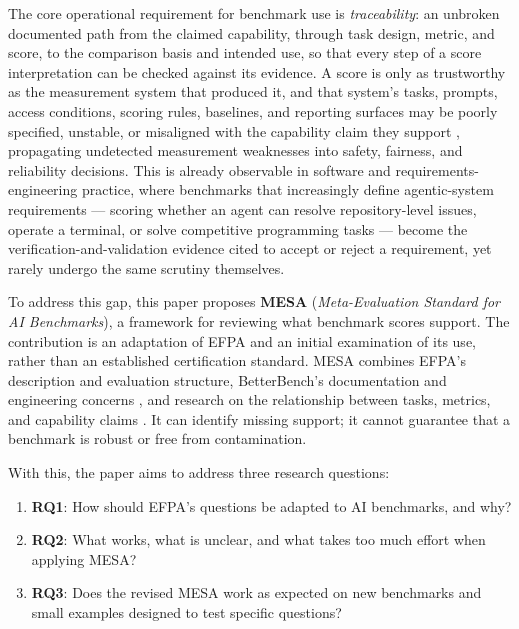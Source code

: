 \documentclass[conference]{IEEEtran}
\begin{document}
    The core operational requirement for benchmark use is \textit{traceability}: an unbroken documented path from the claimed capability, through task design, metric, and score, to the comparison basis and intended use, so that every step of a score interpretation can be checked against its evidence. A score is only as trustworthy as the measurement system that produced it, and that system's tasks, prompts, access conditions, scoring rules, baselines, and reporting surfaces may be poorly specified, unstable, or misaligned with the capability claim they support \cite{singh_leaderboard_illusion,line_goes_up}, propagating undetected measurement weaknesses into safety, fairness, and reliability decisions. This is already observable in software and requirements-engineering practice, where benchmarks that increasingly define agentic-system requirements --- scoring whether an agent can resolve repository-level issues, operate a terminal, or solve competitive programming tasks --- become the verification-and-validation evidence cited to accept or reject a requirement, yet rarely undergo the same scrutiny themselves.
    
    To address this gap, this paper proposes \textbf{MESA} (\textit{Meta-Evaluation Standard for AI Benchmarks}), a framework for reviewing what benchmark scores support. The contribution is an adaptation of EFPA and an initial examination of its use, rather than an established certification standard. MESA combines EFPA's description and evaluation structure, BetterBench's documentation and engineering concerns \cite{reuel_betterbench}, and research on the relationship between tasks, metrics, and capability claims \cite{bean_measuring_what_matters,hendrycks_definition_agi}. It can identify missing support; it cannot guarantee that a benchmark is robust or free from contamination.
    
    With this, the paper aims to address three research questions:
    \begin{enumerate}[leftmargin=*]
        \item \textbf{RQ1}: How should EFPA's questions be adapted to AI benchmarks, and why?
        \item \textbf{RQ2}: What works, what is unclear, and what takes too much effort when applying MESA?
        \item \textbf{RQ3}: Does the revised MESA work as expected on new benchmarks and small examples designed to test specific questions?
    \end{enumerate}
    
\end{document}
